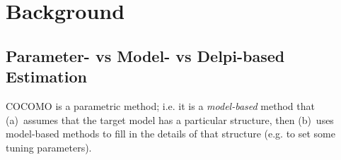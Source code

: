 \documentclass{sig-alternate}
\newenvironment{changed}{\par\color{MyDarkBlue}}{\par}
\begin{document}
\section{Background}





\subsection{Parameter- vs Model- vs Delpi-based Estimation}

\begin{changed}

COCOMO is a parametric method; i.e. it is a 
{\em model-based} method that (a)~assumes that the target model has a particular structure,
then (b)~uses model-based methods to fill in the details of that structure (e.g. to set some tuning parameters).



\end{changed}
\end{document}
